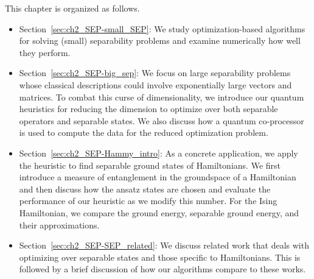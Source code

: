 This chapter is organized as follows.
\begin{itemize}
    \item Section~\ref{sec:ch2_SEP-small_SEP}: We study optimization-based algorithms for solving (small) separability problems and examine numerically how well they perform.
    \item Section~\ref{sec:ch2_SEP-big_sep}: We focus on large separability problems whose classical descriptions could involve exponentially large vectors and matrices.
    To combat this curse of dimensionality, we introduce our quantum heuristics for reducing the dimension to optimize over both separable operators and separable states.
    We also discuss how a quantum co-processor is used to compute the data for the reduced optimization problem.
    \item Section~\ref{sec:ch2_SEP-Hammy_intro}: As a concrete application, we apply the heuristic to find separable ground states of Hamiltonians.
    We first introduce a measure of entanglement in the groundspace of a Hamiltonian and then discuss how the ansatz states are chosen and evaluate the performance of our heuristic as we modify this number.
    For the Ising Hamiltonian, we compare the ground energy, separable ground energy, and their approximations.
    \item Section~\ref{sec:ch2_SEP-SEP_related}: We discuss related work that deals with optimizing over separable states and those specific to Hamiltonians. 
    This is followed by a brief discussion of how our algorithms compare to these works.
\end{itemize}

